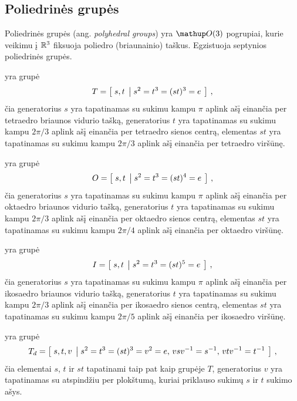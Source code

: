 
\subsection{Poliedrinės grupės}

Poliedrinės grupės (ang. \emph{polyhedral groups}) yra $\Orth3$ pogrupiai,
kurie veikimu į $\mathbb{R}^3$ fiksuoja poliedro (briaunainio) taškus.
Egzistuoja septynios poliedrinės grupės.

\begin{definition}
	 yra grupė 
	\begin{equation}
		T = \left[\; s,t \;\left|\; s^2=t^3=(st)^3=e \;\right.\right]
		\,,
	\end{equation}
	čia generatorius $s$ yra tapatinamas su sukimu kampu $\pi$ aplink ašį einančia per tetraedro briaunos vidurio tašką,
	generatorius $t$ yra tapatinamas su sukimu kampu $2\pi/3$ aplink ašį einančia per tetraedro sienos centrą,
	elementas $st$ yra tapatinamas su sukimu kampu $2\pi/3$ aplink ašį einančia per tetraedro viršūnę.
\end{definition}

\begin{definition}
	 yra grupė 
	\begin{equation}
		O = \left[\; s,t \;\left|\; s^2=t^3=(st)^4=e \;\right.\right]
		\,,
	\end{equation}
	čia generatorius $s$ yra tapatinamas su sukimu kampu $\pi$ aplink ašį einančia per oktaedro briaunos vidurio tašką,
	generatorius $t$ yra tapatinamas su sukimu kampu $2\pi/3$ aplink ašį einančia per oktaedro sienos centrą,
	elementas $st$ yra tapatinamas su sukimu kampu $2\pi/4$ aplink ašį einančia per oktaedro viršūnę.
\end{definition}

\begin{definition}
	 yra grupė 
	\begin{equation}
		I = \left[\; s,t \;\left|\; s^2=t^3=(st)^5=e \;\right.\right]
		\,,
	\end{equation}
	čia generatorius $s$ yra tapatinamas su sukimu kampu $\pi$ aplink ašį einančia per ikosaedro briaunos vidurio tašką,
	generatorius $t$ yra tapatinamas su sukimu kampu $2\pi/3$ aplink ašį einančia per ikosaedro sienos centrą,
	elementas $st$ yra tapatinamas su sukimu kampu $2\pi/5$ aplink ašį einančia per ikosaedro viršūnę.
\end{definition}

\begin{definition}
	 yra grupė 
	\begin{equation}
		T_d = \left[\; s,t,v \;\left|\; s^2=t^3=(st)^3=v^2=e,\, vsv^{-1}=s^{-1},\, vtv^{-1}=t^{-1} \;\right.\right]
		\,,
	\end{equation}
	čia elementai $s$, $t$ ir $st$ tapatinami taip pat kaip grupėje $T$,
	generatorius $v$ yra tapatinamas su atspindžiu per plokštumą,
	kuriai priklauso sukimų $s$ ir $t$ sukimo ašys.
\end{definition}

